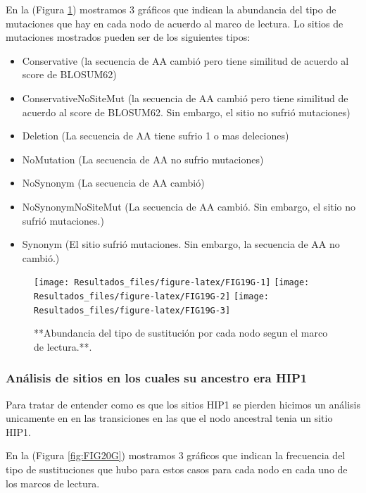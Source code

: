 \documentclass[
]{book}
\providecommand{\tightlist}{%
  \setlength{\itemsep}{0pt}\setlength{\parskip}{0pt}}
\begin{document}
En la (Figura \ref{fig:FIG19G}) mostramos 3 gráficos que indican la abundancia del tipo de mutaciones que hay en cada nodo de acuerdo al marco de lectura. Lo sitios de mutaciones mostrados pueden ser de los siguientes tipos:

\begin{itemize}
\tightlist
\item
  Conservative (la secuencia de AA cambió pero tiene similitud de acuerdo al score de BLOSUM62)
\item
  ConservativeNoSiteMut (la secuencia de AA cambió pero tiene similitud de acuerdo al score de BLOSUM62. Sin embargo, el sitio no sufrió mutaciones)
\item
  Deletion (La secuencia de AA tiene sufrio 1 o mas deleciones)
\item
  NoMutation (La secuencia de AA no sufrio mutaciones)
\item
  NoSynonym (La secuencia de AA cambió)
\item
  NoSynonymNoSiteMut (La secuencia de AA cambió. Sin embargo, el sitio no sufrió mutaciones.)
\item
  Synonym (El sitio sufrió mutaciones. Sin embargo, la secuencia de AA no cambió.)
\end{itemize}

\begin{figure}

{\centering \texttt{[image: Resultados\_files/figure-latex/FIG19G-1]} \texttt{[image: Resultados\_files/figure-latex/FIG19G-2]} \texttt{[image: Resultados\_files/figure-latex/FIG19G-3]} 

}

\caption{**Abundancia del tipo de sustitución por cada nodo segun el marco de lectura.**.}\label{fig:FIG19G}
\end{figure}

\hypertarget{anuxe1lisis-de-sitios-en-los-cuales-su-ancestro-era-hip1-2}{%
\subsubsection{Análisis de sitios en los cuales su ancestro era HIP1}\label{anuxe1lisis-de-sitios-en-los-cuales-su-ancestro-era-hip1-2}}

Para tratar de entender como es que los sitios HIP1 se pierden hicimos un análisis unicamente en en las transiciones en las que el nodo ancestral tenia un sitio HIP1.

En la (Figura \ref{fig:FIG20G}) mostramos 3 gráficos que indican la frecuencia del tipo de sustituciones que hubo para estos casos para cada nodo en cada uno de los marcos de lectura.
\end{document}
